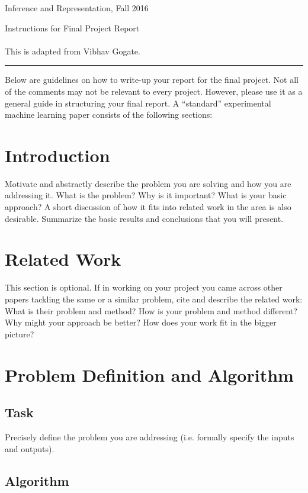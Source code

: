\documentclass{article}
\newcommand{\ruleskip}{\bigskip\hrule\bigskip}
\begin{document}
\pagestyle{myheadings} 

{\LARGE
\begin{center}Inference and Representation, Fall 2016\end{center}
}

{\Large
Instructions for Final Project Report
}\\ \\
 This is adapted from Vibhav Gogate.
\ruleskip

Below are guidelines on how to write-up your report for the final project. Not all of the comments may not be relevant to every project. However, please use it as a general guide in structuring your final report. A ``standard'' experimental machine learning paper consists of the following sections:

\section{Introduction}
Motivate and abstractly describe the problem you are solving and how you are addressing it. What is the problem? Why is it important? What is your basic approach?
A short discussion of how it fits into related work in the area is also desirable.
Summarize the basic results and conclusions that you will present.

\section{Related Work}

This section is optional. If in working on your project you came across other papers tackling the same or a similar problem, cite and describe the related work:
What is their problem and method? How is your problem and method different? Why might your approach be better? How does your work fit in the bigger picture?

\section{Problem Definition and Algorithm}
\subsection{Task}

Precisely define the problem you are addressing (i.e. formally specify the inputs and outputs).

\subsection{Algorithm}
\end{document}

